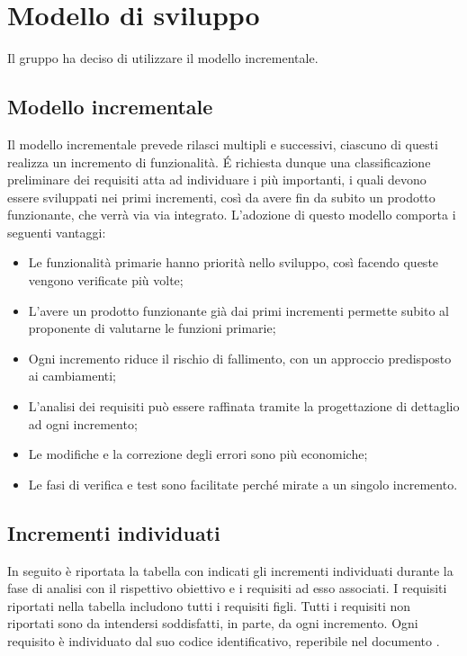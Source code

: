 \section{Modello di sviluppo}
Il gruppo ha deciso di utilizzare il modello incrementale.
\subsection{Modello incrementale}
Il modello incrementale prevede rilasci multipli e successivi, ciascuno di questi realizza un incremento di funzionalità.
\'E richiesta dunque una classificazione preliminare dei requisiti atta ad individuare i più importanti, i quali devono essere sviluppati nei primi incrementi, così da avere fin da subito un prodotto funzionante, che verrà via via integrato.
L'adozione di questo modello comporta i seguenti vantaggi:
\begin{itemize}
\item Le funzionalità primarie hanno priorità nello sviluppo, così facendo queste vengono verificate più volte;
\item L'avere un prodotto funzionante già dai primi incrementi permette subito al proponente di valutarne le funzioni primarie;
\item Ogni incremento riduce il rischio di fallimento, con un approccio predisposto ai cambiamenti;
\item L'analisi dei requisiti può essere raffinata tramite la progettazione di dettaglio ad ogni incremento;
\item Le modifiche e la correzione degli errori sono più economiche;
\item Le fasi di verifica e test sono facilitate perché mirate a un singolo incremento.
\end{itemize}
\subsection{Incrementi individuati}
In seguito è riportata la tabella con indicati gli incrementi individuati durante la fase di analisi con il rispettivo obiettivo e i requisiti ad esso associati.
I requisiti riportati nella tabella includono tutti i requisiti figli. Tutti i requisiti non riportati sono da intendersi soddisfatti, in parte, da ogni incremento.
Ogni requisito è individuato dal suo codice identificativo, reperibile nel documento \AdRv{}.

